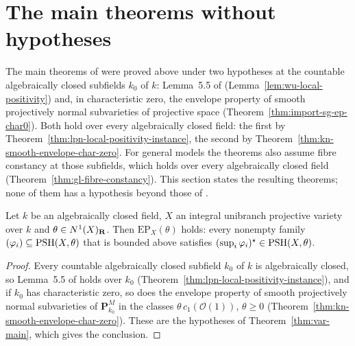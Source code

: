 \section{The main theorems without hypotheses}
\label{sec:main-fully-unconditional}

The main theorems of \cite{FHX} were proved above under two hypotheses at the
countable algebraically closed subfields $k_0$ of $k$: Lemma~5.5 of \cite{FHX}
(Lemma~\ref{lem:wu-local-positivity}) and, in characteristic zero, the envelope
property of smooth projectively normal subvarieties of projective space
(Theorem~\ref{thm:import-sg-ep-char0}). Both hold over every algebraically
closed field: the first by Theorem~\ref{thm:lpn-local-positivity-instance}, the
second by Theorem~\ref{thm:kn-smooth-envelope-char-zero}. For general models
the theorems also assume fibre constancy at those subfields, which holds over
every algebraically closed field (Theorem~\ref{thm:gl-fibre-constancy}). This
section states the resulting theorems; none of them has a hypothesis beyond
those of \cite{FHX}.

\begin{theorem}
\label{thm:fu-variety-main}
\leanok
Let $k$ be an algebraically closed field, $X$ an integral unibranch projective
variety over $k$ and $\theta\in N^1(X)_{\mathbf{R}}$. Then $\mathrm{EP}_X(\theta)$ holds:
every nonempty family $(\varphi_i)\subseteq\operatorname{PSH}(X,\theta)$ that is bounded above
satisfies $(\sup_i\varphi_i)^\star\in\operatorname{PSH}(X,\theta)$.
\end{theorem}
\begin{proof}
Every countable algebraically closed subfield $k_0$ of $k$ is algebraically
closed, so Lemma~5.5 of \cite{FHX} holds over $k_0$
(Theorem~\ref{thm:lpn-local-positivity-instance}), and if $k_0$ has
characteristic zero, so does the envelope property of smooth projectively normal
subvarieties of $\mathbf P^M_{k_0}$ in the classes $\theta\,c_1(\mathcal O(1))$,
$\theta\geq0$ (Theorem~\ref{thm:kn-smooth-envelope-char-zero}). These are the
hypotheses of Theorem~\ref{thm:var-main}, which gives the conclusion.
\end{proof}


